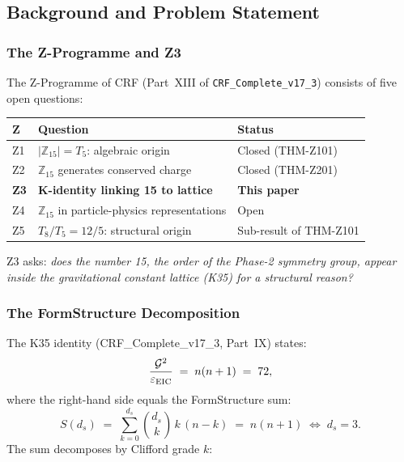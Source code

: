 \documentclass[12pt, a4paper]{article}
\begin{document}
\subsection{Background and Problem Statement}
\label{sec:setup}

\subsubsection{The Z-Programme and Z3}

The Z-Programme of CRF (Part~XIII of \texttt{CRF\_Complete\_v17\_3})
consists of five open questions:

\begin{center}
{\small
\renewcommand{\arraystretch}{1.3}
\begin{tabular}{p{0.8cm} p{8cm} p{3cm}}
\toprule
\textbf{Z} & \textbf{Question} & \textbf{Status} \\
\midrule
Z1 & $|\mathbb{Z}_{15}| = T_5$: algebraic origin & Closed (THM-Z101) \\
Z2 & $\mathbb{Z}_{15}$ generates conserved charge & Closed (THM-Z201) \\
\textbf{Z3} & \textbf{K-identity linking 15 to lattice} & \textbf{This paper} \\
Z4 & $\mathbb{Z}_{15}$ in particle-physics representations & Open \\
Z5 & $T_8/T_5 = 12/5$: structural origin & Sub-result of THM-Z101 \\
\bottomrule
\end{tabular}
}
\end{center}

Z3 asks: \emph{does the number 15, the order of the Phase-2 symmetry
group, appear inside the gravitational constant lattice (K35) for
a structural reason?}

\subsubsection{The FormStructure Decomposition}

The K35 identity (CRF\_Complete\_v17\_3, Part~IX) states:
\begin{equation}
  \frac{\mathcal{G}^2}{\varepsilon_{\rm EIC}} \;=\; n(n+1) \;=\; 72,
  \label{eq:K35}
\end{equation}
where the right-hand side equals the FormStructure sum:
\begin{equation}
  S(d_s) \;=\; \sum_{k=0}^{d_s} \binom{d_s}{k}\, k\,(n-k)
  \;=\; n(n+1) \;\iff\; d_s = 3.
  \label{eq:FormStructure}
\end{equation}
The sum decomposes by Clifford grade $k$:
\end{document}

